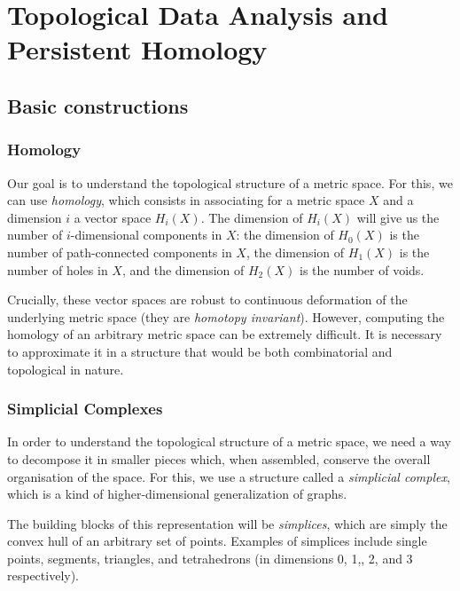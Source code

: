 \documentclass[a4paper,11pt,openany,extrafontsizes]{memoir}
\begin{document}

\chapter{Topological Data Analysis and Persistent Homology}%
\label{cha:tda-ph}

\section{Basic constructions}%
\label{sec:basic-constructions}

\subsection{Homology}%
\label{sec:homology}

Our goal is to understand the topological structure of a metric
space. For this, we can use \emph{homology}, which consists in
associating for a metric space $X$ and a dimension $i$ a vector space
$H_i(X)$. The dimension of $H_i(X)$ will give us the number of
$i$-dimensional components in $X$: the dimension of $H_0(X)$ is the
number of path-connected components in $X$, the dimension of $H_1(X)$
is the number of holes in $X$, and the dimension of $H_2(X)$ is the
number of voids.

Crucially, these vector spaces are robust to continuous deformation of
the underlying metric space (they are \emph{homotopy
  invariant}). However, computing the homology of an arbitrary metric
space can be extremely difficult. It is necessary to approximate it in
a structure that would be both combinatorial and topological in
nature.

\subsection{Simplicial Complexes}%
\label{sec:simplicial-complexes}

In order to understand the topological structure of a metric space, we
need a way to decompose it in smaller pieces which, when assembled,
conserve the overall organisation of the space. For this, we use a
structure called a \emph{simplicial complex}, which is a kind of
higher-dimensional generalization of graphs.

The building blocks of this representation will be \emph{simplices},
which are simply the convex hull of an arbitrary set of
points. Examples of simplices include single points, segments,
triangles, and tetrahedrons (in dimensions 0, 1,, 2, and 3
respectively).
\end{document}
